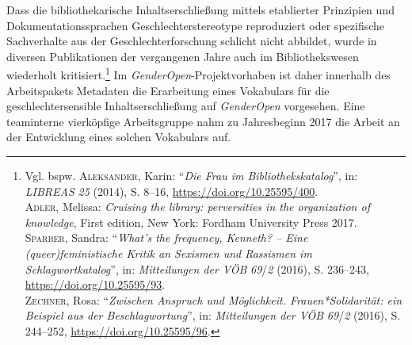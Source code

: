 \documentclass[a4paper,
fontsize=11pt,
oneside,
numbers=noperiodatend,
parskip=half-,
bibliography=totoc,
final
]{scrartcl}
\begin{document}
Dass die bibliothekarische Inhaltserschließung mittels etablierter
Prinzipien und Dokumentationssprachen Geschlechterstereotype
reproduziert oder spezifische Sachverhalte aus der Geschlechterforschung
schlicht nicht abbildet, wurde in diversen Publikationen der vergangenen
Jahre auch im Bibliothekswesen wiederholt kritisiert.\footnote{Vgl.
  bspw. \textsc{Aleksander}, Karin: \enquote{\emph{Die Frau im
  Bibliothekskatalog}}, in: \emph{LIBREAS} \emph{25} (2014), S. 8--16,
  \url{https://doi.org/10.25595/400}.\\
  \textsc{Adler}, Melissa: \emph{Cruising the library: perversities in
  the organization of knowledge}, First edition, New York: Fordham
  University Press 2017.\\
  \textsc{Sparber}, Sandra: \enquote{\emph{What's the frequency,
  Kenneth? -- Eine (queer)feministische Kritik an Sexismen und Rassismen
  im Schlagwortkatalog}}, in: \emph{Mitteilungen der VÖB}
  \emph{69}/\emph{2} (2016), S. 236--243,
  \url{https://doi.org/10.25595/93}.\\
  \textsc{Zechner}, Rosa: \enquote{\emph{Zwischen Anspruch und
  Möglichkeit. Frauen*Solidarität: ein Beispiel aus der
  Beschlagwortung}}, in: \emph{Mitteilungen der VÖB} \emph{69}/\emph{2}
  (2016), S. 244--252, \url{https://doi.org/10.25595/96}.} Im
\emph{GenderOpen}-Projektvorhaben ist daher innerhalb des Arbeitspakets
Metadaten die Erarbeitung eines Vokabulars für die geschlechtersensible
Inhaltserschließung auf \emph{GenderOpen} vorgesehen. Eine teaminterne
vierköpfige Arbeitsgruppe nahm zu Jahresbeginn 2017 die Arbeit an der
Entwicklung eines solchen Vokabulars auf.
\end{document}
